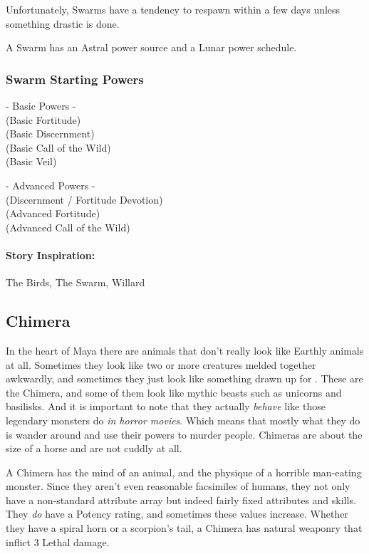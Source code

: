 Unfortunately, Swarms have a tendency to respawn within a few days unless something drastic is done.

A Swarm has an Astral power source and a Lunar power schedule.

\subsubsection{Swarm Starting Powers}

\hspace{\parindent} - Basic Powers -\\
 (Basic Fortitude)\\
 (Basic Discernment)\\
 (Basic Call of the Wild)\\
 (Basic Veil)

- Advanced Powers -\\
 (Discernment / Fortitude Devotion)\\
 (Advanced Fortitude)\\
 (Advanced Call of the Wild)

\paragraph{Story Inspiration:} The Birds, The Swarm, Willard

\subsection{Chimera} 

In the heart of Maya there are animals that don't really look like Earthly animals at all. Sometimes they look like two or more creatures melded together awkwardly, and sometimes they just look like something drawn up for . These are the Chimera, and some of them look like mythic beasts such as unicorns and basilisks. And it is important to note that they actually \textit{behave} like those legendary monsters do \textit{in horror movies}. Which means that mostly what they do is wander around and use their powers to murder people. Chimeras are about the size of a horse and are not cuddly at all.

A Chimera has the mind of an animal, and the physique of a horrible man-eating monster. Since they aren't even reasonable facsimiles of humans, they not only have a non-standard attribute array but indeed fairly fixed attributes and skills. They \textit{do} have a Potency rating, and sometimes these values increase. Whether they have a spiral horn or a scorpion's tail, a Chimera has natural weaponry that inflict 3 Lethal damage.

